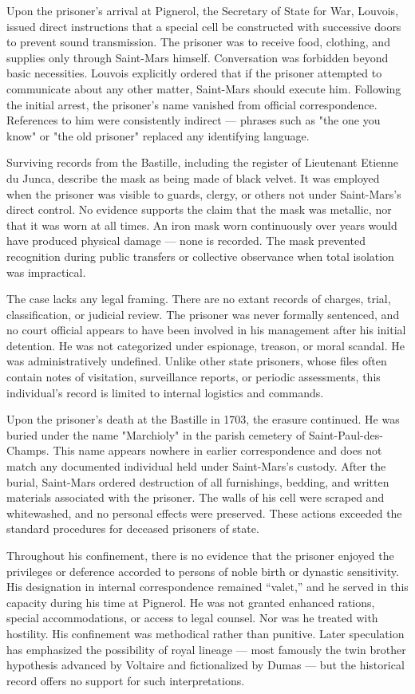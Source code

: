 Upon the prisoner's arrival at Pignerol, the Secretary of State for War, Louvois, issued direct instructions that a special cell be constructed with successive doors to prevent sound transmission. The prisoner was to receive food, clothing, and supplies only through Saint-Mars himself. Conversation was forbidden beyond basic necessities. Louvois explicitly ordered that if the prisoner attempted to communicate about any other matter, Saint-Mars should execute him. Following the initial arrest, the prisoner's name vanished from official correspondence. References to him were consistently indirect — phrases such as "the one you know" or "the old prisoner" replaced any identifying language.

Surviving records from the Bastille, including the register of Lieutenant Etienne du Junca, describe the mask as being made of black velvet. It was employed when the prisoner was visible to guards, clergy, or others not under Saint-Mars's direct control. No evidence supports the claim that the mask was metallic, nor that it was worn at all times. An iron mask worn continuously over years would have produced physical damage — none is recorded. The mask prevented recognition during public transfers or collective observance when total isolation was impractical.

The case lacks any legal framing. There are no extant records of charges, trial, classification, or judicial review. The prisoner was never formally sentenced, and no court official appears to have been involved in his management after his initial detention. He was not categorized under espionage, treason, or moral scandal. He was administratively undefined. Unlike other state prisoners, whose files often contain notes of visitation, surveillance reports, or periodic assessments, this individual's record is limited to internal logistics and commands.

Upon the prisoner's death at the Bastille in 1703, the erasure continued. He was buried under the name "Marchioly" in the parish cemetery of Saint-Paul-des-Champs. This name appears nowhere in earlier correspondence and does not match any documented individual held under Saint-Mars's custody. After the burial, Saint-Mars ordered destruction of all furnishings, bedding, and written materials associated with the prisoner. The walls of his cell were scraped and whitewashed, and no personal effects were preserved. These actions exceeded the standard procedures for deceased prisoners of state. 

Throughout his confinement, there is no evidence that the prisoner enjoyed the privileges or deference accorded to persons of noble birth or dynastic sensitivity. His designation in internal correspondence remained “valet,” and he served in this capacity during his time at Pignerol. He was not granted enhanced rations, special accommodations, or access to legal counsel. Nor was he treated with hostility. His confinement was methodical rather than punitive. Later speculation has emphasized the possibility of royal lineage — most famously the twin brother hypothesis advanced by Voltaire and fictionalized by Dumas — but the historical record offers no support for such interpretations.


